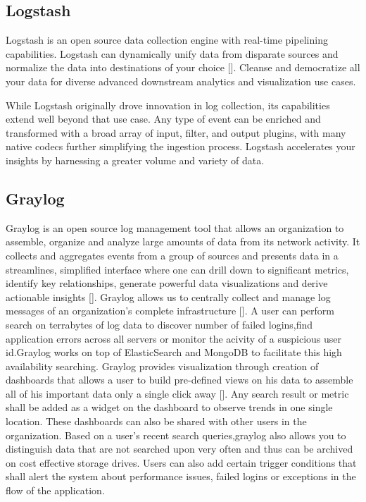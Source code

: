 \subsection{Logstash}

Logstash is an open source data collection engine with real-time
pipelining capabilities. Logstash can dynamically unify data from
disparate sources and normalize the data into destinations of your
choice [\cite{www-logstash}]. Cleanse and democratize all your data for
diverse advanced downstream analytics and visualization use cases.

While Logstash originally drove innovation in log collection, its
capabilities extend well beyond that use case. Any type of event can
be enriched and transformed with a broad array of input, filter, and
output plugins, with many native codecs further simplifying the
ingestion process. Logstash accelerates your insights by harnessing a
greater volume and variety of data.
  
\subsection{Graylog}

Graylog is an open source log management tool that allows an
organization to assemble, organize and analyze large amounts of data
from its network activity. It collects and aggregates events from a
group of sources and presents data in a streamlines, simplified
interface where one can drill down to significant metrics, identify
key relationships, generate powerful data visualizations and derive
actionable insights [\cite{www-graylog-blog}].  Graylog allows us to
centrally collect and manage log messages of an organization's
complete infrastructure [\cite{www-graylog-optimization}]. A user can
perform search on terrabytes of log data to discover number of failed
logins,find application errors across all servers or monitor the
acivity of a suspicious user id.Graylog works on top of ElasticSearch
and MongoDB to facilitate this high availability searching.  Graylog
provides visualization through creation of dashboards that allows a
user to build pre-defined views on his data to assemble all of his
important data only a single click away
[\cite{www-graylog-dashboards}]. Any search result or metric shall be
added as a widget on the dashboard to observe trends in one single
location. These dashboards can also be shared with other users in the
organization. Based on a user's recent search queries,graylog also
allows you to distinguish data that are not searched upon very often
and thus can be archived on cost effective storage drives. Users can
also add certain trigger conditions that shall alert the system about
performance issues, failed logins or exceptions in the flow of the
application.
    
